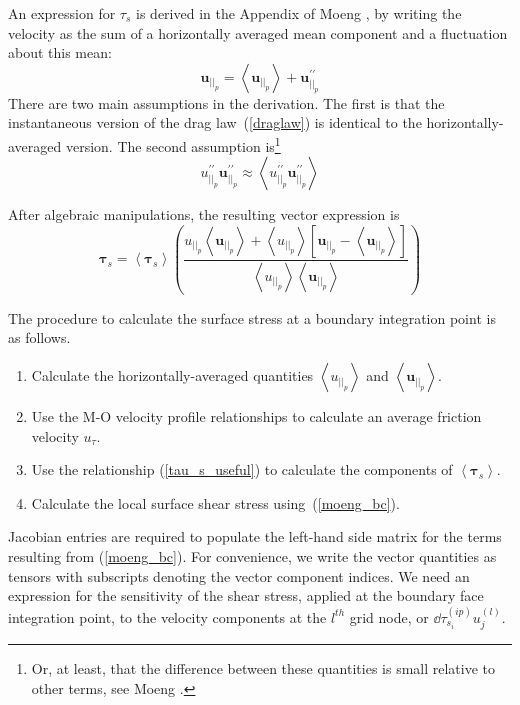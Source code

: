 An expression for $\tau_s$ is derived in the Appendix of Moeng \cite{Moeng:84}, by
writing the velocity as the sum of a horizontally averaged mean
component and a fluctuation about this mean:
\begin{equation}
  \mathbf{u}_{{||}_p} = \left< \mathbf{u}_{{||}_p} \right> +
  \mathbf{u}_{{||}_p}^{\prime\prime}
\end{equation}
There are two main assumptions in the derivation.  The first is that
the instantaneous version of the drag law~(\ref{draglaw}) is
identical to the horizontally-averaged version.  The second assumption
is\footnote{Or, at least, that the difference between these quantities
  is small relative to other terms, see Moeng \cite{Moeng:84}.
}
\begin{equation}
  u_{{||}_p}^{\prime\prime} \mathbf{u}_{{||}_p}^{\prime\prime} \approx
  \left< u_{{||}_p}^{\prime\prime} \mathbf{u}_{{||}_p}^{\prime\prime}
  \right>
\end{equation}

After algebraic manipulations, the resulting vector expression is
\begin{equation} \label{moeng_bc}
  \mathbf{\tau}_s = \left< \mathbf{\tau}_s \right> \left( \frac{u_{{||}_p}
  \left< \mathbf{u}_{{||}_p} \right> +  \left< u_{{||}_p} \right>
  \left[ \mathbf{u}_{{||}_p} - \left< \mathbf{u}_{{||}_p} \right>
    \right]}{\left<  u_{{||}_p} \right> \left< \mathbf{u}_{{||}_p}
    \right>}\right)
\end{equation}

The procedure to calculate the surface stress at a boundary
integration point is as follows.

\begin{enumerate}
 \item Calculate the horizontally-averaged quantities
   $\left<u_{{||}_p}\right>$ and $\left<\mathbf{u}_{{||}_p}\right>$.
 \item Use the M-O velocity profile relationships \cite{Dyer:74} to
   calculate an average friction velocity $u_\tau$.
 \item Use the relationship (\ref{tau_s_useful}) to calculate the components of  $\left<
   \mathbf{\tau}_s \right>$.
 \item Calculate the local surface shear stress using~(\ref{moeng_bc}).
\end{enumerate}

Jacobian entries are required to populate the left-hand side matrix
for the terms resulting from (\ref{moeng_bc}).  For convenience, we
write the vector quantities as tensors with subscripts denoting the
vector component indices.  We need an expression for the sensitivity
of the shear stress, applied at the boundary face integration point,
to the velocity components at the $l^{th}$ grid node, or
$\dd{\tau_{s_i}^{(ip)}}{u_j^(l)}$.

